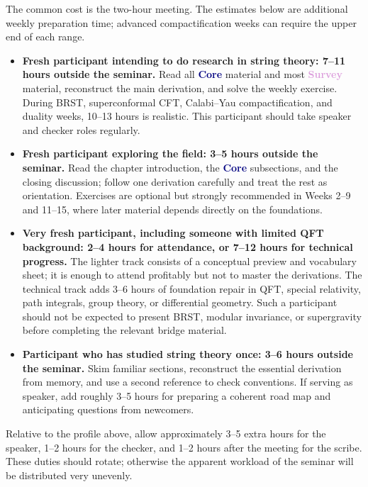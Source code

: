 \documentclass[11pt]{article}
\newcommand{\core}{\textcolor{navy}{\textbf{Core}}}
\newcommand{\survey}{\textcolor{plum}{\textbf{Survey}}}
\begin{document}
The common cost is the two-hour meeting.  The estimates below are additional
weekly preparation time; advanced compactification weeks can require the upper
end of each range.

\begin{itemize}[leftmargin=0pt,label={},itemsep=8pt]
  \item \textbf{Fresh participant intending to do research in string theory: 7--11 hours outside the seminar.}
  Read all \core{} material and most \survey{} material, reconstruct the main
  derivation, and solve the weekly exercise.  During BRST, superconformal CFT,
  Calabi--Yau compactification, and duality weeks, 10--13 hours is realistic.
  This participant should take speaker and checker roles regularly.

  \item \textbf{Fresh participant exploring the field: 3--5 hours outside the seminar.}
  Read the chapter introduction, the \core{} subsections, and the closing
  discussion; follow one derivation carefully and treat the rest as orientation.
  Exercises are optional but strongly recommended in Weeks 2--9 and 11--15,
  where later material depends directly on the foundations.

  \item \textbf{Very fresh participant, including someone with limited QFT background: 2--4 hours for attendance, or 7--12 hours for technical progress.}
  The lighter track consists of a conceptual preview and vocabulary sheet; it
  is enough to attend profitably but not to master the derivations.  The
  technical track adds 3--6 hours of foundation repair in QFT, special
  relativity, path integrals, group theory, or differential geometry.  Such a
  participant should not be expected to present BRST, modular invariance, or
  supergravity before completing the relevant bridge material.

  \item \textbf{Participant who has studied string theory once: 3--6 hours outside the seminar.}
  Skim familiar sections, reconstruct the essential derivation from memory,
  and use a second reference to check conventions.  If serving as speaker, add
  roughly 3--5 hours for preparing a coherent road map and anticipating
  questions from newcomers.
\end{itemize}

\begin{keybox}
Relative to the profile above, allow approximately 3--5 extra hours for the
speaker, 1--2 hours for the checker, and 1--2 hours after the meeting for the
scribe.  These duties should rotate; otherwise the apparent workload of the
seminar will be distributed very unevenly.
\end{keybox}
\end{document}

